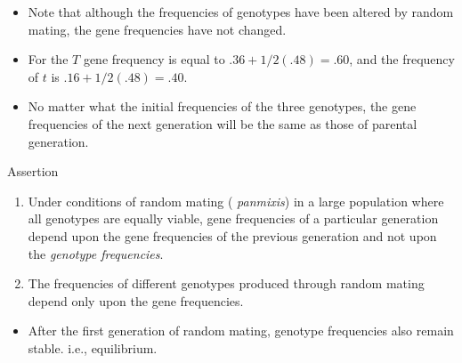 \documentclass[11pt,dvipsnames,ignorenonframetext,aspectratio=169]{beamer}
\providecommand{\tightlist}{%
  \setlength{\itemsep}{0pt}\setlength{\parskip}{0pt}}
\begin{document}
\begin{frame}{}
\protect\hypertarget{section-6}{}

\begin{itemize}
\tightlist
\item
  Note that although the frequencies of genotypes have been altered by
  random mating, the gene frequencies have not changed.
\item
  For the \(T\) gene frequency is equal to \(.36 + 1/2(.48) = .60\), and
  the frequency of \(t\) is \(.16 + 1/2(.48) = .40\).
\item
  No matter what the initial frequencies of the three genotypes, the
  gene frequencies of the next generation will be the same as those of
  parental generation.
\end{itemize}

\end{frame}

\begin{frame}{Assertion}
\protect\hypertarget{assertion}{}

\begin{enumerate}
\tightlist
\item
  Under conditions of random mating ( \emph{panmixis}) in a large
  population where all genotypes are equally viable, gene frequencies of
  a particular generation depend upon the gene frequencies of the
  previous generation and not upon the \emph{genotype frequencies}.
\item
  The frequencies of different genotypes produced through random mating
  depend only upon the gene frequencies.
\end{enumerate}

\begin{itemize}
\tightlist
\item
  After the first generation of random mating, genotype frequencies also
  remain stable. i.e., equilibrium.
\end{itemize}

\end{frame}
\end{document}
